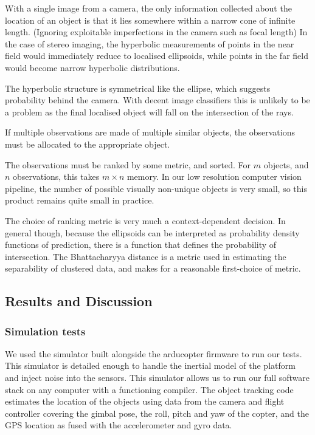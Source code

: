 \documentclass{article}
\newcounter{subsubsubsection}[subsubsection]
\begin{document}
        With a single image from a camera, the only information collected about the location of an object is that it lies somewhere within a narrow cone of infinite length.  (Ignoring exploitable imperfections in the camera such as focal length)
        In the case of stereo imaging, the hyperbolic measurements of points in the near field would immediately reduce to localised ellipsoids, while points in the far field would become narrow hyperbolic distributions.

        The hyperbolic structure is symmetrical like the ellipse, which suggests probability behind the camera.  With decent image classifiers this is unlikely to be a problem as the final localised object will fall on the intersection of the rays.

        If multiple observations are made of multiple similar objects, the observations must be allocated to the appropriate object.

        The observations must be ranked by some metric, and sorted.  For \(m\) objects, and \(n\) observations, this takes \(m \times n\) memory.  In our low resolution computer vision pipeline, the number of possible visually non-unique objects is very small, so this product remains quite small in practice.

        The choice of ranking metric is very much a context-dependent decision.  In general though, because the ellipsoids can be interpreted as probability density functions of prediction, there is a function that defines the probability of intersection. The Bhattacharyya distance is a metric used in estimating the separability of clustered data, and makes for a reasonable first-choice of metric.


  \subsection{Results and Discussion}

    \subsubsection{Simulation tests}
      We used the simulator built alongside the arducopter firmware to run our tests.  This simulator is detailed enough to handle the inertial model of the platform and inject noise into the sensors.
      This simulator allows us to run our full software stack on any computer with a functioning compiler.
      The object tracking code estimates the location of the objects using data from the camera and flight controller covering the gimbal pose, the roll, pitch and yaw of the copter, and the GPS location as fused with the accelerometer and gyro data.
\end{document}
